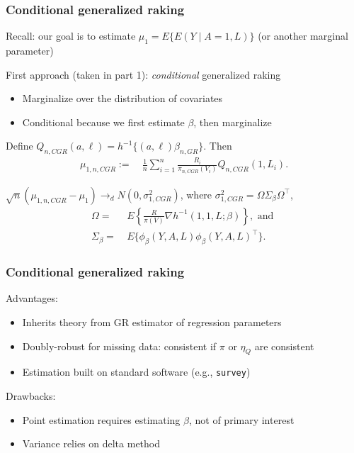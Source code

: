 \documentclass[10pt, table]{beamer}
\begin{document}
\begin{frame} \frametitle{Conditional generalized raking}
  Recall: our goal is to estimate $\mu_1 = E\{E(Y \mid A = 1, L)\}$ (or another marginal parameter)
  
  First approach (taken in part 1): \textit{conditional} generalized raking \vspace{-0.2cm}
  \begin{itemize}
    \item Marginalize over the distribution of covariates
    \item Conditional because we first estimate $\beta$, then marginalize
  \end{itemize} \pause

  Define $Q_{n,CGR}(a,\ell) = h^{-1}\{(a,\ell)\beta_{n,GR}\}$. Then 
  \begin{align*}
    \mu_{1,n,CGR} :=& \ \frac{1}{n}\sum_{i=1}^n \frac{R_i}{\pi_{n,CGR}(V_i)} Q_{n,CGR}(1,L_i).
  \end{align*} \pause

  $\sqrt{n}(\mu_{1,n,CGR} - \mu_1) \to_d N(0, \sigma^2_{1,CGR})$, where $\sigma^2_{1,CGR} = \Omega\Sigma_\beta \Omega^\top$,
  \begin{align*}
    \Omega =& \ E\left\{\frac{R}{\pi(V)}\nabla h^{-1}(1,1,L;\beta)\right\}, \text{ and } \\
    \Sigma_\beta =& \ E\{\phi_\beta(Y,A,L) \phi_\beta(Y,A,L)^\top\}.
  \end{align*}
\end{frame}

\begin{frame} \frametitle{Conditional generalized raking}
  Advantages: \vspace{-0.4cm} 
  \begin{itemize}
    \item Inherits theory from GR estimator of regression parameters
    \item Doubly-robust for missing data: consistent if $\pi$ or $\eta_Q$ are consistent
    \item Estimation built on standard software (e.g., \texttt{survey})
  \end{itemize} \pause

  Drawbacks:\vspace{-0.4cm}
  \begin{itemize}
    \item Point estimation requires estimating $\beta$, not of primary interest
    \item Variance relies on delta method
  \end{itemize}
\end{frame}
\end{document}
